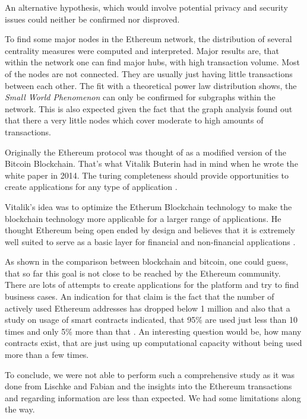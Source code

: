 An alternative hypothesis, which would involve potential privacy and security issues could neither be confirmed nor disproved.

To find some major nodes in the Ethereum network, the distribution of several centrality measures were computed and interpreted. 
Major results are, that within the network one can find major hubs, with high transaction volume. Most of the nodes are not connected. 
They are usually just having little transactions between each other. 
The fit with a theoretical power law distribution shows, the \emph{Small World Phenomenon} can only be confirmed for subgraphs within the network.
This is also expected given the fact that the graph analysis found out that there a very little nodes which cover moderate to high amounts of transactions.

Originally the Ethereum protocol was thought of as a modified version of the Bitcoin Blockchain. 
That's what Vitalik Buterin had in mind when he wrote the white paper in 2014. 
The turing completeness should provide opportunities to create applications for any type of application \cite{vitalikwhite}.

Vitalik's idea was to optimize the Etherum Blockchain technology to make the blockchain technology more applicable for a larger range of applications. 
He thought Ethereum being open ended by design and believes that it is extremely well suited to serve as a basic layer for financial and non-financial applications \cite{vitalikwhite}.

As shown in the comparison between blockchain and bitcoin, one could guess, that so far this goal is not close to be reached by the Ethereum community. 
There are lots of attempts to create applications for the platform and try to find business cases. 
An indication for that claim is the fact that the number of actively used Ethereum addresses has dropped below 1 million and also that a study on usage of smart contracts indicated, that 95\% are used just less than 10 times and only 5\% more than that \cite{Chandersekhar2018}.
An interesting question would be, how many contracts exist, that are just using up computational capacity without being used more than a few times.

To conclude, we were not able to perform such a comprehensive study as it was done from Lischke and Fabian and the insights into the Ethereum transactions and regarding information are less than expected. 
We had some limitations along the way.

